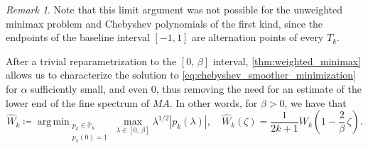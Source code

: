 \documentclass[a4paper]{article}
\DeclareMathOperator*{\argmin}{arg\,min}
\theoremstyle{plain}
\theoremstyle{definition}
\theoremstyle{remark}
\newtheorem{remark}{Remark}[section]
\begin{document}
\begin{remark}
	Note that this limit argument was not possible for the unweighted minimax problem and Chebyshev polynomials of the first kind, since the endpoints of the baseline interval \([-1,1]\) are alternation points of every \(T_k\).
\end{remark}

After a trivial reparametrization to the \([0, \, \beta]\) interval, \cref{thm:weighted_minimax} allows us to characterize the solution to \eqref{eq:chebyshev_smoother_minimization} for \(\alpha\) sufficiently small, and even 0, thus removing the need for an estimate of the lower end of the fine spectrum of \(MA\). In other words, for \(\beta > 0\), we have that
\begin{equation}\label{eq:chebyshev_4th_kind}
	\hat{W}_k \coloneqq \argmin_{\substack{p_k \in \mathbb{P}_k\\ p_k(0) = 1}} \max_{\lambda\in [0,\, \beta]} \lambda^{1/2} |p_k(\lambda)|, \quad \hat{W}_k(\zeta) = \frac{1}{2k + 1} W_k\left(1 - \frac{2}{\beta} \,\zeta\right).
\end{equation}
\end{document}
